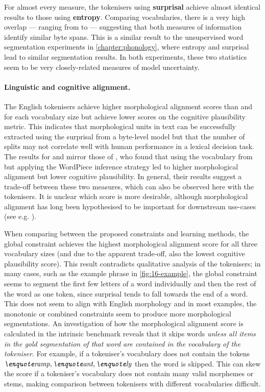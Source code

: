 For almost every measure, the tokenisers using \textbf{surprisal} achieve almost identical results to those using \textbf{entropy}. Comparing vocabularies, there is a very high overlap --- ranging from  to  --- suggesting that both measures of information identify similar byte spans. This is a similar result to the unsupervised word segmentation experiments in \cref{chapter:phonology}, where entropy and surprisal lead to similar segmentation results. In both experiments, these two statistics seem to be very closely-related measures of model uncertainty. %

\paragraph{Linguistic and cognitive alignment.}

The English \tokname tokenisers achieve higher morphological alignment scores than \bpe and \bpewp for each vocabulary size but achieve lower scores on the cognitive plausibility metric. This indicates that morphological units in text can be successfully extracted using the surprisal from a byte-level model but that the number of splits may not correlate well with human performance in a lexical decision task. The results for \bpe and \bpewp mirror those of \citet{uzan-etal-2024-greed}, who found that using the vocabulary from \bpe but applying the WordPiece inference strategy led to higher morphological alignment but lower cognitive plausibility. In general, their results suggest a trade-off between these two measures, which can also be observed here with the \tokname tokenisers. It is unclear which score is more desirable, although morphological alignment has long been hypothesised to be important for downstream use-cases (see e.g. \citet{gow-smith-etal-2022-improving}).

When comparing between the proposed constraints and learning methods, the global constraint achieves the highest morphological alignment score for all three vocabulary sizes (and due to the apparent trade-off, also the lowest cognitive plausibility score). This result contradicts qualitative analysis of the tokenisers; in many cases, such as the example phrase in \cref{fig:16-example}, the global constraint seems to segment the first few letters of a word individually and then the rest of the word as one token, since surprisal tends to fall towards the end of a word. This does not seem to align with English morphology and in most examples, the monotonic or combined constraints seem to produce more morphological segmentations. An investigation of how the morphological alignment score is calculated in the intrinsic benchmark reveals that it skips words \emph{unless all items in the gold segmentation of that word are contained in the vocabulary of the tokeniser}. For example, if a tokeniser's vocabulary does not contain the tokens \(\ex{ramp}, \ex{ant}, \ex{ly}\) then the word  is skipped. This can skew the score if a tokeniser's vocabulary does not contain many valid morphemes or stems, making comparison between tokenisers with different vocabularies difficult.

